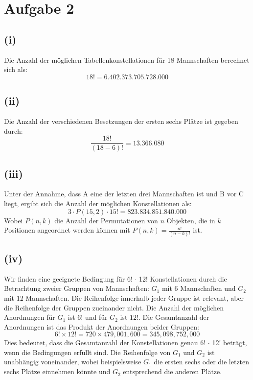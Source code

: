 \documentclass{article}
\begin{document}
\newpage

\section*{Aufgabe 2}

\subsection*{(i)}
Die Anzahl der möglichen Tabellenkonstellationen für 18 Mannschaften berechnet sich als:
\[ 18! = 6.402.373.705.728.000 \]

\subsection*{(ii)}
Die Anzahl der verschiedenen Besetzungen der ersten sechs Plätze ist gegeben durch:
\[ \frac{18!}{(18-6)!} = 13.366.080 \]

\subsection*{(iii)}
Unter der Annahme, dass A eine der letzten drei Mannschaften ist und B vor C liegt, ergibt sich die Anzahl der möglichen Konstellationen als:
\[ 3 \cdot P(15, 2) \cdot 15! = 823.834.851.840.000 \]
Wobei \( P(n, k) \) die Anzahl der Permutationen von \( n \) Objekten, die in \( k \) Positionen angeordnet werden können mit \( P(n, k) = \frac{n!}{(n-k)!} \) ist.

\subsection*{(iv)}
Wir finden eine geeignete Bedingung für 6! \(\cdot\) 12! Konstellationen durch die Betrachtung zweier Gruppen von Mannschaften: \( G_1 \) mit 6 Mannschaften und \( G_2 \) mit 12 Mannschaften. Die Reihenfolge innerhalb jeder Gruppe ist relevant, aber die Reihenfolge der Gruppen zueinander nicht. Die Anzahl der möglichen Anordnungen für \( G_1 \) ist \( 6! \) und für \( G_2 \) ist \( 12! \). Die Gesamtanzahl der Anordnungen ist das Produkt der Anordnungen beider Gruppen:
\[ 6! \times 12! = 720 \times 479,001,600 = 345,098,752,000 \]
Dies bedeutet, dass die Gesamtanzahl der Konstellationen genau 6! \(\cdot\) 12! beträgt, wenn die Bedingungen erfüllt sind. Die Reihenfolge von \( G_1 \) und \( G_2 \) ist unabhängig voneinander, wobei beispielsweise \( G_1 \) die ersten sechs oder die letzten sechs Plätze einnehmen könnte und \( G_2 \) entsprechend die anderen Plätze.
\end{document}
